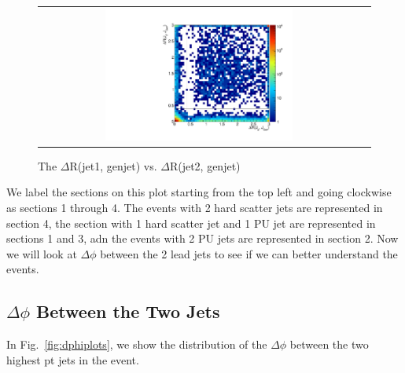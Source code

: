 \begin{figure}[!h]
\begin{center}
\begin{tabular}{cc}
\includegraphics[width=0.6\textwidth]{plots/2D_drgen.pdf}
\end{tabular}
\caption{The $\Delta$R(jet1, genjet) vs. $\Delta$R(jet2, genjet)
\label{fig:2Ddrplot}
}
\end{center}
\end{figure}

We label the sections on this plot starting from the top left and going clockwise as sections 1 through 4. The events with 2 hard scatter jets are represented in section 4, the section with 1 hard scatter jet and 1 PU jet are represented in sections 1 and 3, adn the events with 2 PU jets are represented in section 2. Now we will look at $\Delta\phi$ between the 2 lead jets to see if we can better understand the events.

\subsection{$\Delta\phi$ Between the Two Jets}
In Fig.~\ref{fig:dphiplots}, we show the distribution of the $\Delta\phi$ between the two highest pt jets in the event. 

